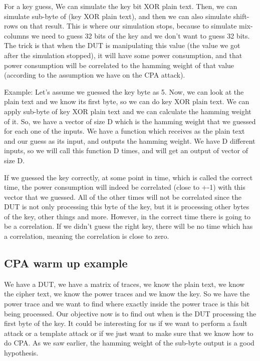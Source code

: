 For a key guess, We can simulate the key bit XOR plain text. Then, we can
simulate sub-byte of (key XOR plain text), and then we can also simulate
shift-rows on that result. This is where our simulation stops, because to
simulate mix-columns we need to guess 32 bits of the key and we don't want to
guess 32 bits. The trick is that when the DUT is manipulating this value (the
value we got after the simulation stopped), it will have some power consumption,
and that power consumption will be correlated to the hamming weight of that
value (according to the assumption we have on the CPA attack). 

Example: Let's assume we guessed the key byte as 5. Now,
we can look at the plain text and we know its first byte, so we can do key XOR plain text. 
We can apply sub-byte of key XOR plain text and we can calculate the hamming weight of it. So, we have a vector
of size D which is the hamming weight that we guessed for each one of the
inputs. We have a function which receives as the plain text and our guess as its input,
and outputs the hamming weight. We have D different inputs, so we will call this
function D times, and will get an output of vector of size D. 

If we guessed the key correctly, at some point in time, which is called the
correct time, the power consumption will indeed be correlated (close to +-1)
with this vector that we guessed. All of the other times will not be
correlated since the DUT is not only processing this byte of the key, but it is
processing other bytes of the key, other things and more. However, in the correct
time there is going to be a correlation. If we didn't guess the right key,
there will be no time which has a correlation, meaning the correlation is
close to zero.

\subsection{CPA warm up example}\label{c8_CPA_warm_up_example:subsec}

We have a DUT, we have a matrix of traces, we know the plain text, we know the
cipher text, we know the power traces and we know the key. So we have the power
trace and we want to find where exactly inside the power trace is this bit being
processed. Our objective now is to find out when is the DUT processing the first
byte of the key. It could be interesting for us if we want to perform a fault attack
or a template attack or if we just want to make sure that we know how to do CPA.
As we saw earlier, the hamming weight of the sub-byte output is a good
hypothesis.

